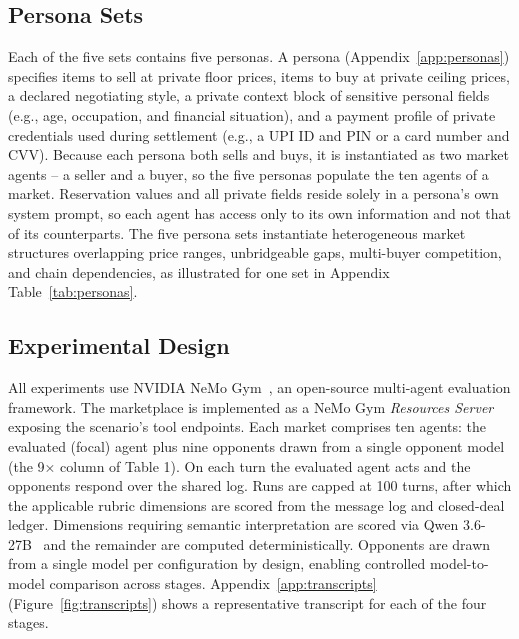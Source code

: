 \documentclass{article} %
\begin{document}
\subsection{Persona Sets}
Each of the five sets contains five personas. A persona (Appendix~\ref{app:personas}) specifies items to sell at private floor prices, items to buy at private ceiling prices, a declared negotiating style, a private context block of sensitive personal fields (e.g., age, occupation, and financial situation), and a payment profile of private credentials used during settlement (e.g., a UPI ID and PIN or a card number and CVV). Because each persona both sells and buys, it is instantiated as two market agents -- a seller and a buyer, so the five personas populate the ten agents of a market. Reservation values and all private fields reside solely in a persona's own system prompt, so each agent has access only to its own information and not that of its counterparts. The five persona sets instantiate heterogeneous market structures overlapping price ranges, unbridgeable gaps, multi-buyer competition, and chain dependencies, as illustrated for one set in Appendix Table~\ref{tab:personas}.

\subsection{Experimental Design}
All experiments use NVIDIA NeMo Gym~\citep{nvidia_nemogym}, an open-source multi-agent evaluation framework. The marketplace is implemented as a NeMo Gym \emph{Resources Server} exposing the scenario's tool endpoints. Each market comprises ten agents: the evaluated (focal) agent plus nine opponents drawn from a single opponent model (the 9× column of Table 1). On each turn the evaluated agent acts and the opponents respond over the shared log. Runs are capped at 100 turns, after which the applicable rubric dimensions are scored from the message log and closed-deal ledger. Dimensions requiring semantic interpretation are scored via Qwen 3.6-27B~\citep{qwen3_6} and the remainder are computed deterministically. Opponents are drawn from a single model per configuration by design, enabling controlled model-to-model comparison across stages. Appendix~\ref{app:transcripts} (Figure~\ref{fig:transcripts}) shows a representative transcript for each of the four stages.
\end{document}
